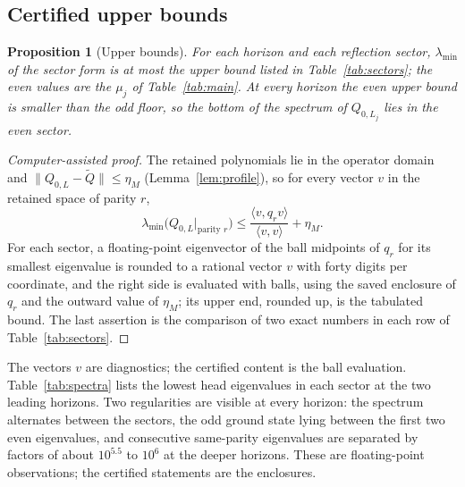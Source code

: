 \documentclass[11pt]{article}
\numberwithin{equation}{section}
\newtheorem{proposition}[theorem]{Proposition}
\theoremstyle{definition}
\theoremstyle{remark}
\newcommand{\norm}[1]{\lVert#1\rVert}
\newcommand{\ip}[2]{\langle#1,#2\rangle}
\begin{document}
\subsection{Certified upper bounds}

\begin{proposition}[Upper bounds]\label{prop:upper}
For each horizon and each reflection sector, $\lambda_{\min}$ of the sector
form is at most the upper bound listed in Table~\ref{tab:sectors}; the even
values are the $\mu_j$ of Table~\ref{tab:main}. At every horizon the even
upper bound is smaller than the odd floor, so the bottom of the spectrum of
$Q_{0,L_j}$ lies in the even sector.
\end{proposition}
\begin{proof}[Computer-assisted proof]
The retained polynomials lie in the operator domain and
$\norm{Q_{0,L}-\widetilde Q}\le\eta_M$ (Lemma~\ref{lem:profile}), so for
every vector $v$ in the retained space of parity $r$,
\[
 \lambda_{\min}\bigl(Q_{0,L}|_{\text{parity }r}\bigr)\le
 \frac{\ip v{q_rv}}{\ip vv}+\eta_M .
\]
For each sector, a floating-point eigenvector of the ball midpoints of $q_r$
for its smallest eigenvalue is rounded to a rational vector $v$ with forty
digits per coordinate, and the right side is evaluated with balls, using the
saved enclosure of $q_r$ and the outward value of $\eta_M$; its upper end,
rounded up, is the tabulated bound. The last assertion is the comparison of
two exact numbers in each row of Table~\ref{tab:sectors}.
\end{proof}

The vectors $v$ are diagnostics; the certified content is the ball evaluation.
Table~\ref{tab:spectra} lists the lowest head eigenvalues in each sector at
the two leading horizons. Two regularities are visible at every horizon: the
spectrum alternates between the sectors, the odd ground state lying between
the first two even eigenvalues, and consecutive same-parity eigenvalues are
separated by factors of about $10^{5.5}$ to $10^{6}$ at the deeper horizons.
These are floating-point observations; the certified statements are the
enclosures.
\end{document}
